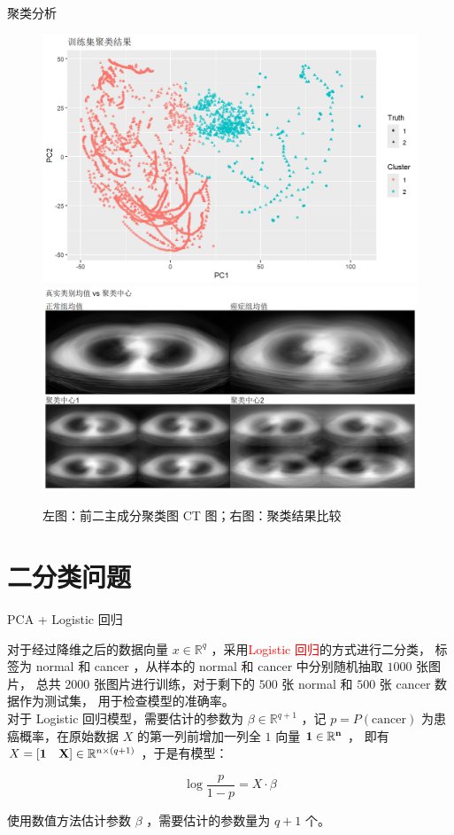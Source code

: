 \documentclass[11pt]{beamer}
\begin{document}
\begin{frame}{聚类分析}{}
\fontsize{9pt}{11pt}\selectfont

\begin{figure}
  \centering
  \includegraphics[width=0.5\linewidth]{imgs/cluster.png}
  \hspace{0.05\linewidth}
  \includegraphics[width=0.5\linewidth]{imgs/cluster_compare.png}
  \caption{左图：前二主成分聚类图 CT 图；右图：聚类结果比较}
\end{figure}

\end{frame}


\section{二分类问题}

\begin{frame}{PCA + Logistic 回归}{}
\fontsize{9pt}{11pt}\selectfont

对于经过降维之后的数据向量 $x \in \mathbb{R}^q$ ，采用\textcolor{red}{Logistic 回归}的方式进行二分类，
标签为 normal 和 cancer ，从样本的 normal 和 cancer 中分别随机抽取 $1000$ 张图片，
总共 $2000$ 张图片进行训练，对于剩下的 $500$ 张 normal 和 $500$ 张 cancer 数据作为测试集，
用于检查模型的准确率。\\[0.5em]

对于 Logistic 回归模型，需要估计的参数为 $\beta \in \mathbb{R}^{q+1}$ ，记 $p = P(\text{cancer})$ 
为患癌概率，在原始数据 $X$ 的第一列前增加一列全 $1$ 向量 $\bf{1} \in \mathbb{R}^n$ ，
即有 $X = \left[\bf{1}\quad X \right]\in \mathbb{R}^{n\times (q+1)}$ ，于是有模型：

$$
\log \frac{p}{1-p} = X\cdot \beta
$$

使用数值方法估计参数 $\beta$ ，需要估计的参数量为 $q+1$ 个。

\end{frame}
\end{document}
